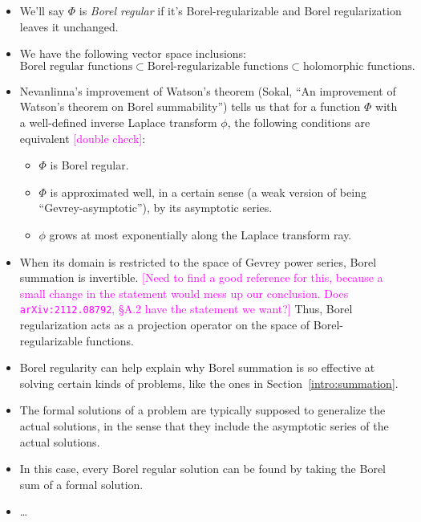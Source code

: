 \documentclass{article}
\begin{document}
\begin{itemize}
\item We'll say $\Phi$ is {\em Borel regular} if it's Borel-regularizable and Borel regularization leaves it unchanged.
\item We have the following vector space inclusions:
\[ \text{Borel regular functions} \subset \text{Borel-regularizable functions} \subset \text{holomorphic functions}. \]
\item Nevanlinna's improvement of Watson's theorem (Sokal, ``An improvement of Watson's theorem on Borel summability'') tells us that for a function $\Phi$ with a well-defined inverse Laplace transform $\phi$, the following conditions are equivalent \textcolor{magenta}{[double check]}:
\begin{itemize}
\item $\Phi$ is Borel regular.
\item $\Phi$ is approximated well, in a certain sense (a weak version of being ``Gevrey-asymptotic''), by its asymptotic series.
\item $\phi$ grows at most exponentially along the Laplace transform ray.
\end{itemize}
\item When its domain is restricted to the space of Gevrey power series, Borel summation is invertible. \textcolor{magenta}{[Need to find a good reference for this, because a small change in the statement would mess up our conclusion. Does \texttt{arXiv:2112.08792}, \S A.2 have the statement we want?]} Thus, Borel regularization acts as a projection operator on the space of Borel-regularizable functions.
\item Borel regularity can help explain why Borel summation is so effective at solving certain kinds of problems, like the ones in Section~\ref{intro:summation}.
\item The formal solutions of a problem are typically supposed to generalize the actual solutions, in the sense that they include the asymptotic series of the actual solutions.
\item In this case, every Borel regular solution can be found by taking the Borel sum of a formal solution.
\item \ldots
\end{itemize}
\end{document}

